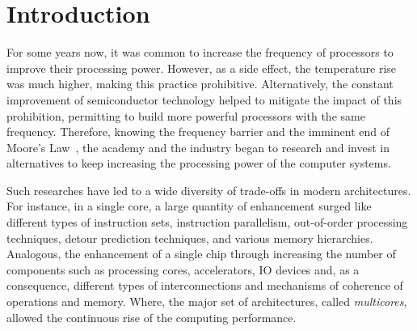 \chapter{Introduction}
\label{ch.intro}

    For some years now, it was common to increase the frequency of processors to improve their processing power.
    However, as a side effect, the temperature rise was much higher, making this practice prohibitive.
    Alternatively, the constant improvement of semiconductor technology helped to mitigate the impact of this prohibition, permitting to build more powerful processors with the same frequency.
    Therefore, knowing the frequency barrier and the imminent end of Moore's Law~\cite{moore:1965}, the academy and the industry began to research and invest in alternatives to keep increasing the processing power of the computer systems.

    Such researches have led to a wide diversity of trade-offs in modern architectures.
    For instance, in a single core, a large quantity of enhancement surged like different types of instruction sets, instruction parallelism, out-of-order processing techniques, detour prediction techniques, and various memory hierarchies.
    Analogous, the enhancement of a single chip through increasing the number of components such as processing cores, accelerators, IO devices and, as a consequence, different types of interconnections and mechanisms of coherence of operations and memory.
    Where, the major set of architectures, called \textit{multicores}, allowed the continuous rise of the computing performance.

